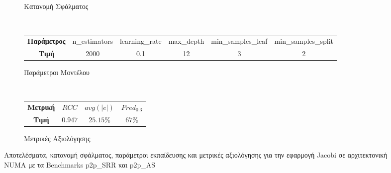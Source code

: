 \begin{figure}[ht]
\begin{subfigure}[b]{0.47\textwidth}
        \caption{Κατανομή Σφάλματος}
    \end{subfigure} 
    \\[0.2cm]
    \begin{subfigure}[b]{\textwidth}
   	 	\scriptsize
		\begin{tabular}{c||c|c|c|c|c}
			\textbf{Παράμετρος} & n\_estimators & learning\_rate & max\_depth & min\_samples\_leaf & min\_samples\_split \\
			\textbf{Τιμή}       &       2000        &  0.1               & 12          &  3                  &    2
		\end{tabular}
		\caption{Παράμετροι Μοντέλου}
    \end{subfigure}
    \\[0.2cm]
    \begin{subfigure}[b]{\textwidth}
    		\centering
   	 	\scriptsize
		\begin{tabular}{c||c|c|c}
			\textbf{Μετρική} & $RCC$ &   $avg(|e|)$ & $Pred_{0.3}$  \\
			\textbf{Τιμή}  &  $0.947$   &      $25.15\%
			$        &  $67\%$                                         
		\end{tabular}
		\caption{Μετρικές Αξιολόγησης}
    \end{subfigure}
    
        \caption{Αποτελέσματα, κατανομή σφάλματος, παράμετροι εκπαίδευσης και μετρικές αξιολόγησης για την εφαρμογή Jacobi σε αρχιτεκτονική NUMA με τα Benchmarks p2p\_SRR και p2p\_AS}
    \label{fig:NB_cg_jacobi_NUMA}
\end{figure}
